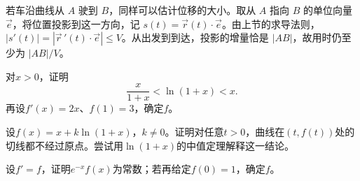 若车沿曲线从 \(A\) 驶到 \(B\)，同样可以估计位移的大小。取从 \(A\) 指向 \(B\) 的单位向量 \(\vec e\)，将位置投影到这一方向，记 \(s(t)=\vec r(t)\cdot\vec e\)。由上节的求导法则，\(|s'(t)|=|\vec r\,'(t)\cdot\vec e|\le V\)。从出发到到达，投影的增量恰是 \(|AB|\)，故用时仍至少为 \(|AB|/V\)。

\begin{example}
对\(x>0\)，证明
\begin{equation*}
 \frac{x}{1+x}<\ln(1+x)<x.
\end{equation*}
再设\(f'(x)=2x\)、\(f(1)=3\)，确定\(f\)。
\end{example}

\begin{example}
设\(f(x)=x+k\ln(1+x)\)，\(k\ne0\)。证明对任意\(t>0\)，曲线在\((t,f(t))\)处的切线都不经过原点。尝试用\(\ln(1+x)\)的中值定理解释这一结论。
\end{example}

\begin{example}
设\(f'=f\)，证明\(e^{-x}f(x)\)为常数；若再给定\(f(0)=1\)，确定\(f\)。
\end{example}

